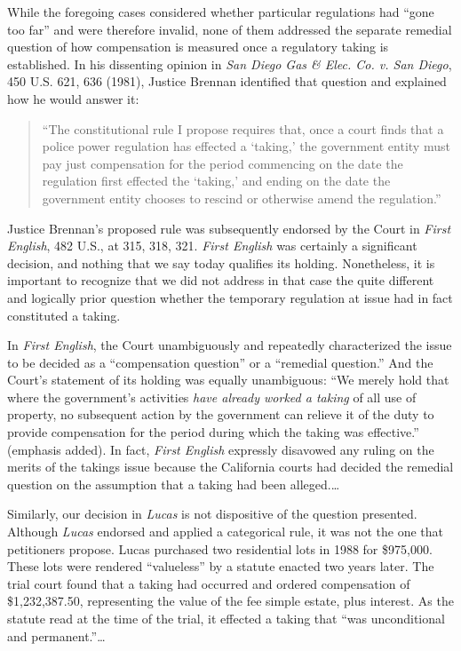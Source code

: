 While the foregoing cases considered whether particular regulations had ``gone
too far'' and were therefore invalid, none of them addressed the separate
remedial question of how compensation is measured once a regulatory taking is
established. In his dissenting opinion in \textit{San Diego Gas \& Elec. Co. v.
San Diego}, 450 U.S. 621, 636 (1981), Justice Brennan identified that question
and explained how he would answer it:
\begin{quote}
``The constitutional rule I propose requires that, once a court finds that a
police power regulation has effected a `taking,' the government entity must pay
just compensation for the period commencing on the date the regulation first
effected the `taking,' and ending on the date the government entity chooses to
rescind or otherwise amend the regulation.'' 
\end{quote}

Justice Brennan's proposed rule was subsequently endorsed by the Court in
\textit{First English}, 482 U.S., at 315, 318, 321. \textit{First English} was
certainly a significant decision, and nothing that we say today qualifies its
holding. Nonetheless, it is important to recognize that we did not address in
that case the quite different and logically prior question whether the temporary
regulation at issue had in fact constituted a taking.

In \textit{First English}, the Court unambiguously and repeatedly characterized
the issue to be decided as a ``compensation question'' or a ``remedial
question.'' And the Court's statement of its holding was equally unambiguous:
``We merely hold that where the government's activities \textit{have already
worked a taking} of all use of property, no subsequent action by the government
can relieve it of the duty to provide compensation for the period during which
the taking was effective.'' (emphasis added). In fact, \textit{First English}
expressly disavowed any ruling on the merits of the takings issue because the
California courts had decided the remedial question on the assumption that a
taking had been alleged.\ldots

Similarly, our decision in \textit{Lucas} is not dispositive of the question
presented. Although \textit{Lucas} endorsed and applied a categorical rule, it
was not the one that petitioners propose. Lucas purchased two residential lots
in 1988 for \$975,000. These lots were rendered ``valueless'' by a statute
enacted two years later. The trial court found that a taking had occurred and
ordered compensation of \$1,232,387.50, representing the value of the fee simple
estate, plus interest. As the statute read at the time of the trial, it effected
a taking that ``was unconditional and permanent.''\ldots

